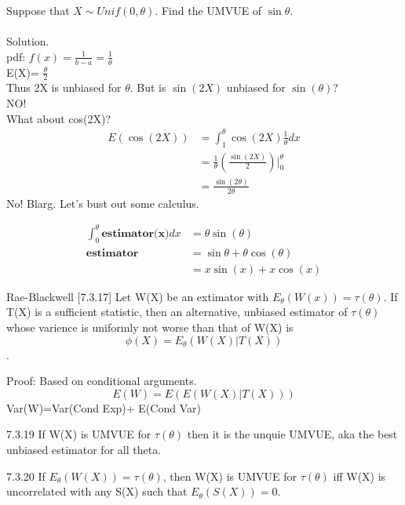 \documentclass[11pt,fleqn]{book} %
\begin{document}
\begin{example} Suppose that $X \sim Unif(0,\theta)$. Find the UMVUE of $\sin\theta$.\\
\\
Solution. \\
pdf: $f(x)=\frac{1}{b-a} = \frac{1}{\theta}$\\
E(X)= $\frac{\theta}{2}$\\
Thus 2X is unbiased for $\theta$. But is $\sin(2X)$  unbiased for $\sin(\theta)$?\\
NO!\\

What about cos(2X)?
\begin{align*}
E(\cos(2X))&= \int^\theta_1 \cos(2X)\frac{1}{\theta}dx\\
	&= \frac{1}{\theta}\left(\frac{\sin(2X)}{2} \right)|^\theta_0\\
	&=\frac{\sin(2\theta)}{2\theta}
\end{align*}
No! Blarg. Let's bust out some calculus.

\begin{align*}
	\int^\theta_0 \textbf{estimator(x)} dx &= \theta \sin(\theta)\\
		\textbf{estimator} &= \sin\theta+\theta\cos(\theta)\\
			&= x\sin(x)+x\cos(x)
\end{align*}
 	
 \end{example} 

 \begin{theorem}{Rae-Blackwell [7.3.17]} Let W(X) be an extimator with $E_\theta(W(x))=\tau(\theta)$. If T(X) is a sufficient statistic, then an alternative, unbiased estimator of $\tau(\theta)$ whose varience is uniformly not worse than that of W(X) is
 	$$\phi(X)=E_\theta(W(X)|T(X))$$.
 \end{theorem}

 Proof: Based on conditional arguments. 
 $$E(W)=E(E(W(X)|T(X)))$$ Var(W)=Var(Cond Exp)+ E(Cond Var)

 \begin{theorem}{7.3.19}
 	If W(X) is UMVUE for $\tau(\theta)$ then it is the unquie UMVUE, aka the best unbiased estimator for all theta. 
 \end{theorem}

 \begin{theorem}{7.3.20}
 	If $E_\theta(W(X))=\tau(\theta)$, then W(X) is UMVUE for $\tau(\theta)$ iff W(X) is uncorrelated with any S(X) such that $E_\theta(S(X))=0$. 
 \end{theorem}
\end{document}
